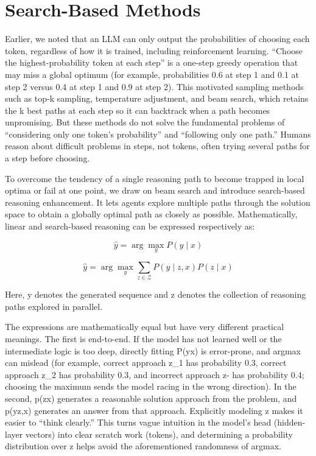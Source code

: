 \setcounter{section}{1}

\hypertarget{search-based-methods}{%
\section{Search-Based Methods}\label{search-based-methods}}

Earlier, we noted that an LLM can only output the probabilities of choosing each token, regardless of how it is trained, including reinforcement learning. ``Choose the highest-probability token at each step'' is a one-step greedy operation that may miss a global optimum (for example, probabilities 0.6 at step 1 and 0.1 at step 2 versus 0.4 at step 1 and 0.9 at step 2). This motivated sampling methods such as top-k sampling, temperature adjustment, and beam search, which retains the k best paths at each step so it can backtrack when a path becomes unpromising. But these methods do not solve the fundamental problems of ``considering only one token's probability'' and ``following only one path.'' Humans reason about difficult problems in steps, not tokens, often trying several paths for a step before choosing.

To overcome the tendency of a single reasoning path to become trapped in local optima or fail at one point, we draw on beam search and introduce search-based reasoning enhancement. It lets agents explore multiple paths through the solution space to obtain a globally optimal path as closely as possible. Mathematically, linear and search-based reasoning can be expressed respectively as:

\[
\hat{y}=\arg\max_y P(y\mid x)
\]

\[
\hat{y}=\arg\max_y\sum_{z\in\mathcal{Z}}P(y\mid z,x)P(z\mid x)
\]

Here, y denotes the generated sequence and z denotes the collection of reasoning paths explored in parallel.

The expressions are mathematically equal but have very different practical meanings. The first is end-to-end. If the model has not learned well or the intermediate logic is too deep, directly fitting P(y\textbar x) is error-prone, and argmax can mislead (for example, correct approach z\_1 has probability 0.3, correct approach z\_2 has probability 0.3, and incorrect approach z- has probability 0.4; choosing the maximum sends the model racing in the wrong direction). In the second, p(z\textbar x) generates a reasonable solution approach from the problem, and p(y\textbar z,x) generates an answer from that approach. Explicitly modeling z makes it easier to ``think clearly.'' This turns vague intuition in the model's head (hidden-layer vectors) into clear scratch work (tokens), and determining a probability distribution over z helps avoid the aforementioned randomness of argmax.

